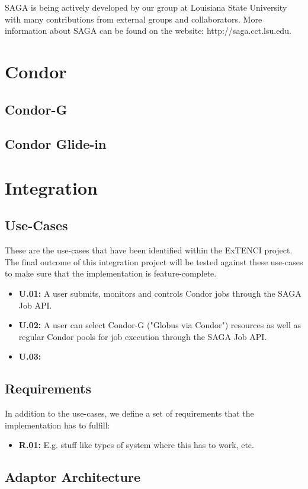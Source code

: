 SAGA is being actively developed by our group at Louisiana State University
with many contributions from external groups and collaborators. More information
about SAGA can be found on the website: http://saga.cct.lsu.edu.


	
	
\section {Condor}
	
\subsection{Condor-G}
	
\subsection{Condor Glide-in}

\section {Integration}

\subsection{Use-Cases}
These are the use-cases that have been identified within the ExTENCI project. The
final outcome of this integration project will be tested against these use-cases
to make sure that the implementation is feature-complete.

\begin{itemize}
\item \textbf{U.01:} A user submits, monitors and controls Condor jobs through
the SAGA Job API.

\item \textbf{U.02:} A user can select Condor-G ("Globus via Condor") resources
as well as regular Condor pools for job execution through the SAGA Job API.

\item \textbf{U.03:}

\end{itemize}

\subsection{Requirements}

In addition to the use-cases, we define a set of requirements that the 
implementation has to fulfill:

\begin{itemize}
\item \textbf{R.01:} E.g. stuff like types of system where this has to work, etc.
\end{itemize}

\subsection{Adaptor Architecture}





